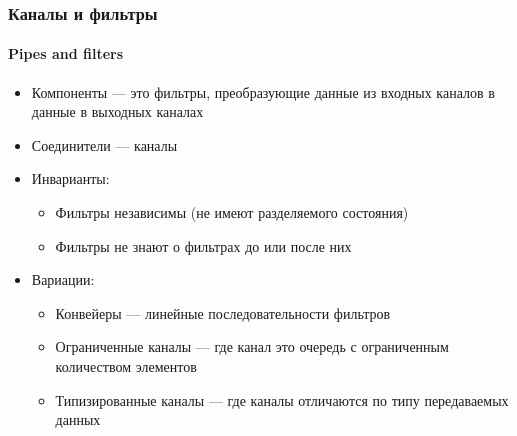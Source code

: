 \documentclass[xetex,mathserif,serif]{beamer}
\begin{document}
    \begin{frame}
        \frametitle{Каналы и фильтры}
        \framesubtitle{Pipes and filters}
        \begin{itemize}
            \item Компоненты --- это фильтры, преобразующие данные из входных каналов в данные в выходных каналах
            \item Соединители --- каналы
            \item Инварианты:
            \begin{itemize}
                \item Фильтры независимы (не имеют разделяемого состояния)
                \item Фильтры не знают о фильтрах до или после них
            \end{itemize}
            \item Вариации:
            \begin{itemize}
                \item Конвейеры --- линейные последовательности фильтров
                \item Ограниченные каналы --- где канал это очередь с ограниченным количеством элементов
                \item Типизированные каналы --- где каналы отличаются по типу передаваемых данных
            \end{itemize}
        \end{itemize}
    \end{frame}
\end{document}
